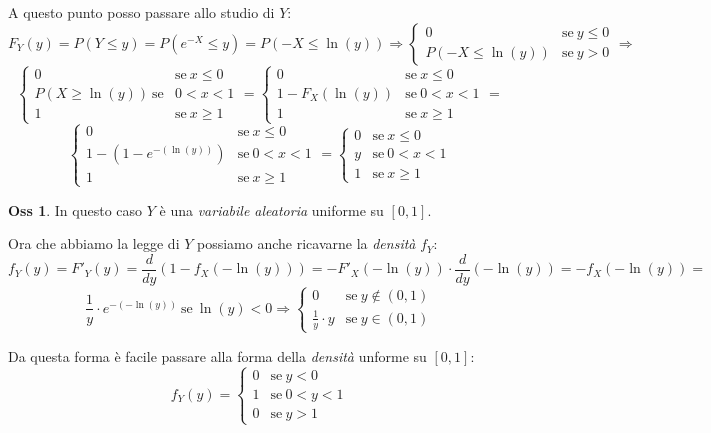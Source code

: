 \documentclass[12pt, a4paper]{report}
\theoremstyle{definition}
\newtheorem*{observation}{Oss}
\begin{document}
A questo punto posso passare allo studio di $Y$:
\[F_Y(y)=P(Y\leq y)=P(e^{-X}\leq y)=P(-X\leq \ln(y))\Rightarrow\begin{cases}
	{0} & \text{se}\ {y\leq 0}\\
	{P(-X\leq\ln(y))} & \text{se}\ {y>0}
\end{cases}\Rightarrow\]
\[\begin{cases}
	{0} & \text{se}\ {x\leq 0}\\
	{P(X\geq\ln(y))}\ \text{se} & {0<x<1}\\
	{1} & \text{se}\ {x\geq 1}
\end{cases}=\begin{cases}
	{0} & \text{se}\ {x\leq 0}\\
	{1-F_X(\ln(y))} & \text{se}\ {0<x<1}\\
	{1} & \text{se}\ {x\geq 1}
\end{cases}=\]
\[\begin{cases}
	{0} & \text{se}\ {x\leq 0}\\
	{1-(1-e^{-(\ln(y))})} & \text{se}\ {0<x<1}\\
	{1} & \text{se}\ {x\geq 1}
\end{cases}=\begin{cases}
	{0} & \text{se}\ {x\leq 0}\\
	{y} & \text{se}\ {0<x<1}\\
	{1} & \text{se}\ {x\geq 1}
\end{cases}\]

\begin{observation}
	In questo caso $Y$ è una \emph{variabile aleatoria} uniforme su $[0,1]$.
\end{observation}

Ora che abbiamo la legge di $Y$ possiamo anche ricavarne la \emph{densità} $f_Y$:
\[f_Y(y)=F'_Y(y)=\frac{d}{dy}(1-f_X(-\ln(y)))=-F'_X(-\ln(y))\cdot \frac{d}{dy}(-\ln(y))
=-f_X(-\ln(y))=\]
\[\frac{1}{y}\cdot e^{-(-\ln(y))}\ \text{se}\ {\ln(y)<0}\Rightarrow\begin{cases}
	{0} & \text{se}\ {y\notin(0,1)}\\
	{\frac{1}{y}\cdot y} & \text{se}\ {y\in(0,1)}
\end{cases}\]

Da questa forma è facile passare alla forma della \emph{densità} unforme su $[0,1]$:
\[f_Y(y)=\begin{cases}
	{0} & \text{se}\ {y<0}\\
	{1} & \text{se}\ {0<y<1}\\
	{0} & \text{se}\ {y>1}
\end{cases}\]
\end{document}
